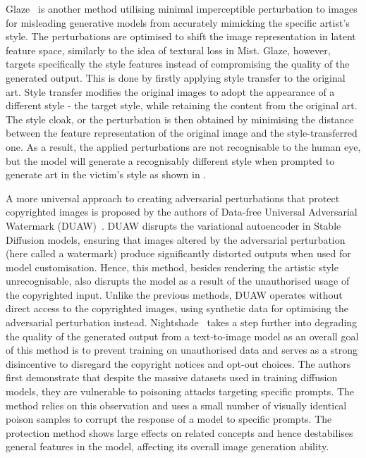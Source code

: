 \documentclass[conference]{IEEEtran}
\begin{document}
Glaze~\cite{shan_glaze_2023} is another method utilising minimal imperceptible perturbation to images for misleading generative models from accurately mimicking the specific artist's style. 
The perturbations are optimised to shift the image representation in latent feature space, similarly to the idea of textural loss in Mist.
Glaze, however, targets specifically the style features instead of compromising the quality of the generated output. 
This is done by firstly applying style transfer to the original art. 
Style transfer modifies the original images to adopt the appearance of a different style - the target style, while retaining the content from the original art. 
The style cloak, or the perturbation is then obtained by minimising the distance between the feature representation of the original image and the style-transferred one.
As a result, the applied perturbations are not recognisable to the human eye, but the model will generate a recognisably different style when prompted to generate art in the victim's style as shown in . 

A more universal approach to creating adversarial perturbations that protect copyrighted images is proposed by the authors of Data-free Universal Adversarial Watermark (DUAW)~\cite{ye_duaw_2023}. 
DUAW disrupts the variational autoencoder in Stable Diffusion models, ensuring that images altered by the adversarial perturbation (here called a watermark) produce significantly distorted outputs when used for model customisation.
Hence, this method, besides rendering the artistic style unrecognisable, also disrupts the model as a result of the unauthorised usage of the copyrighted input. 
Unlike the previous methods, DUAW operates without direct access to the copyrighted images, using synthetic data for optimising the adversarial perturbation instead. 
Nightshade~\cite{shan_prompt-specific_2023} takes a step further into degrading the quality of the generated output from a text-to-image model as an overall goal of this method is to prevent training on unauthorised data and serves as a strong disincentive to disregard the copyright notices and opt-out choices. 
The authors first demonstrate that despite the massive datasets used in training diffusion models, they are vulnerable to poisoning attacks targeting specific prompts. 
The method relies on this observation and uses a small number of visually identical poison samples to corrupt the response of a model to specific prompts. 
The protection method shows large effects on related concepts and hence destabilises general features in the model, affecting its overall image generation ability.
\end{document}
